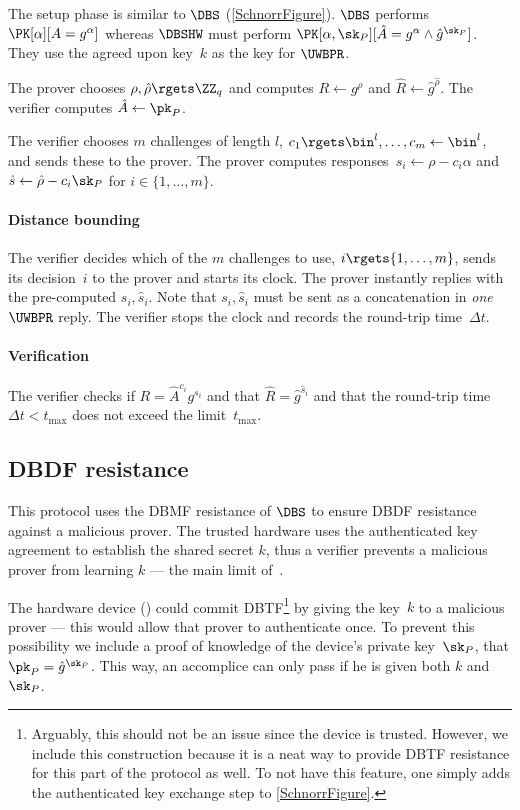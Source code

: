 The setup phase is similar to \(\DBS\) (\cref{SchnorrFigure}).
\(\DBS\) performs \(\PK[\alpha][A = g^\alpha]\) whereas \(\DBSHW\) must perform 
\(\PK[\alpha, \sk_P][\hat A = g^\alpha \land \hat g^{\sk_P}]\).
They use the agreed upon key~\(k\) as the key for \(\UWBPR\).

The prover chooses \(\rho, \hat\rho\rgets \ZZ_q\) and computes \(R\gets 
  g^\rho\) and \(\hat R\gets \hat g^{\hat\rho}\).
The verifier computes \(\hat A\gets \pk_P\).

The verifier chooses \(m\) challenges of length \(l\), \(c_1\rgets \bin^l, 
  \dotsc, c_m\gets \bin^l\), and sends these to the prover.
The prover computes responses~\(s_i\gets \rho - c_i\alpha\) and \(\hat s\gets 
  \hat\rho - c_i\sk_P\) for \(i\in \{1, \dotsc, m\}\).

\paragraph*{Distance bounding}

The verifier decides which of the \(m\) challenges to use, \(i\rgets \{1, 
  \dotsc, m\}\), sends its decision~\(i\) to the prover and starts its clock.
The prover instantly replies with the pre-computed \(s_i, \hat s_i\).
Note that \(s_i, \hat s_i\) must be sent as a concatenation in \emph{one} 
\(\UWBPR\) reply.
The verifier stops the clock and records the round-trip time~\(\Delta t\).

\paragraph*{Verification}

The verifier checks if \(R = \hat A^{c_i} g^{s_i}\) and that \(\hat R =
  \hat g^{\hat s_i}\) and that the round-trip time \(\Delta t < t_{\max}\) does 
not exceed the limit~\(t_{\max}\).


\subsection{\acs*{DBDF} resistance}

This protocol uses the \ac{DBMF} resistance of \(\DBS\) to ensure \ac{DBDF} 
resistance against a malicious prover.
The trusted hardware uses the authenticated key agreement to establish the 
shared secret \(k\), thus a verifier prevents a malicious prover from learning 
\(k\) --- the main limit of~\cite{UWBPR}.

The hardware device (\DBSHW) could commit \ac{DBTF}\footnote{%
  Arguably, this should not be an issue since the device is trusted.
  However, we include this construction because it is a neat way to provide 
  \ac{DBTF} resistance for this part of the protocol as well.
  To not have this feature, one simply adds the authenticated key exchange step 
  to \cref{SchnorrFigure}.
} by giving the key~\(k\) to a malicious prover --- this would allow that 
prover to authenticate once.
To prevent this possibility we include a proof of knowledge of the device's 
private key~\(\sk_P\), \ie that \(\pk_P = \hat g^{\sk_P}\).
This way, an accomplice can only pass if he is given both \(k\) and \(\sk_P\).


